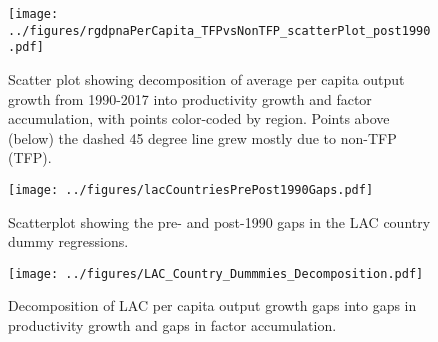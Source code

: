 \documentclass[12pt,english]{article}
\theoremstyle{remark}
\begin{document}
\begin{sidewaysfigure}[ht]
	\texttt{[image: ../figures/rgdpnaPerCapita\_TFPvsNonTFP\_scatterPlot\_post1990.pdf]}
	\caption{Scatter plot showing decomposition of average per capita output growth from 1990-2017 into productivity growth and factor accumulation, with points color-coded by region. Points above (below) the dashed 45 degree line grew mostly due to non-TFP (TFP).}
\end{sidewaysfigure}

\begin{sidewaysfigure}[ht]
	\texttt{[image: ../figures/lacCountriesPrePost1990Gaps.pdf]}
	\caption{Scatterplot showing the pre- and post-1990 gaps in the LAC country dummy regressions.}
\end{sidewaysfigure}

\begin{sidewaysfigure}[ht]
	\texttt{[image: ../figures/LAC\_Country\_Dummmies\_Decomposition.pdf]}
	\caption{Decomposition of LAC per capita output growth gaps into gaps in productivity growth and gaps in factor accumulation.}
\end{sidewaysfigure}
\end{document}
